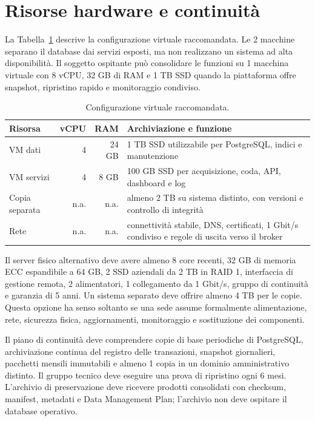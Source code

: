 \documentclass[11pt,a4paper]{report}
\begin{document}
\FloatBarrier

\section*{Risorse hardware e continuità}

La Tabella~\ref{tab:hardware} descrive la configurazione virtuale raccomandata. Le 2 macchine separano il database dai servizi esposti, ma non realizzano un sistema ad alta disponibilità. Il soggetto ospitante può consolidare le funzioni su 1 macchina virtuale con 8 vCPU, 32 GB di RAM e 1 TB SSD quando la piattaforma offre snapshot, ripristino rapido e monitoraggio condiviso.

\begin{table}[ht!]
\centering
\renewcommand{\arraystretch}{1.5}
\small

\begin{tabularx}{\linewidth}{@{}l r r X@{}}
\toprule
Risorsa & vCPU & RAM & Archiviazione e funzione \\
\midrule
VM dati & 4 & 24 GB & 1 TB SSD utilizzabile per PostgreSQL, indici e manutenzione \\
VM servizi & 4 & 8 GB & 100 GB SSD per acquisizione, coda, API, dashboard e log \\
Copia separata & n.a. & n.a. & almeno 2 TB su sistema distinto, con versioni e controllo di integrità \\
Rete & n.a. & n.a. & connettività stabile, DNS, certificati, 1 Gbit/s condiviso e regole di uscita verso il broker \\
\bottomrule
\end{tabularx}

\caption{Configurazione virtuale raccomandata.}
\label{tab:hardware}
\end{table}

Il server fisico alternativo deve avere almeno 8 core recenti, 32 GB di memoria ECC espandibile a 64 GB, 2 SSD aziendali da 2 TB in RAID 1, interfaccia di gestione remota, 2 alimentatori, 1 collegamento da 1 Gbit/s, gruppo di continuità e garanzia di 5 anni. Un sistema separato deve offrire almeno 4 TB per le copie. Questa opzione ha senso soltanto se una sede assume formalmente alimentazione, rete, sicurezza fisica, aggiornamenti, monitoraggio e sostituzione dei componenti.

Il piano di continuità deve comprendere copie di base periodiche di PostgreSQL, archiviazione continua del registro delle transazioni, snapshot giornalieri, pacchetti mensili immutabili e almeno 1 copia in un dominio amministrativo distinto. Il gruppo tecnico deve eseguire una prova di ripristino ogni 6 mesi. L'archivio di preservazione deve ricevere prodotti consolidati con checksum, manifest, metadati e Data Management Plan; l'archivio non deve ospitare il database operativo.
\end{document}
